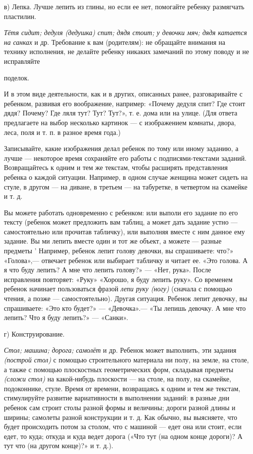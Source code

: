 \documentclass[a5paper]{book}
\renewcommand{\emph}[1]{\textit{#1}}
\begin{document}
в) Лепка. Лучше лепить из глины, но если ее нет, помогайте ребенку
размягчать пластилин.

\emph{Тётя сидит; дедуля (дедушка) спит; дядя стоит; у девочки мяч; дядя
катается на санках} и др. Требование к вам (родителям): не обращайте
внимания на технику исполнения, не делайте ребенку никаких замечаний по
этому поводу и не исправляйте

поделок.

И в этом виде деятельности, как и в других, описанных ранее,
разговаривайте с ребенком, развивая его воображение, например: «Почему
дедуля спит? Где стоит дядя? Почему? Где ляля тут? Тут? Тут?», т. е.
дома или на улице. (Для ответа предлагаете на выбор несколько картинок
--- с изображением комнаты, двора, леса, поля и т. п. в разное время
года.)

Записывайте, какие изображения делал ребенок по тому или иному заданию,
а лучше --- некоторое время сохраняйте его работы с подписями-текстами
заданий. Возвращайтесь к одним и тем же текстам, чтобы расширять
представления ребенка о каждой ситуации. Например, в одном случае
женщина может сидеть на стуле, в другом --- на диване, в третьем --- на
табуретке, в четвертом на скамейке и т. д.

Вы можете работать одновременно с ребенком: или выполи его задание по
его тексту (ребенок может предложить вам таблиц, а может дать задание
устно --- самостоятельно или прочитав табличку), или выполняя вместе с
ним данное ему задание. Вы ми лепить вместе один и тот же объект, а
можете --- разные предметы ' Например, ребенок лепит голову девочки, вы
спрашиваете: что?» «Голова»,--- отвечает ребенок или выбирает табличку и
читает ее. «Это голова. А я что буду лепить? А мне что лепить голову?»
--- «Нет, рука». После исправления повторяет: «Руку» «Хорошо, я буду
лепить руку». Со временем ребенок начинает пользоваться фразой
\emph{лепи руку (ногу)} (сначала с помощью чтения, а позже ---
самостоятельно). Другая ситуация. Ребенок лепит девочку, вы спрашиваете:
«Это кто будет?» --- «Девочка».--- «Ты лепишь девочку. А мне что лепить?
Что я буду лепить?» --- «Санки».

г) Конструирование.

\emph{Стол; машина; дорога; самолёт} и др. Ребенок может выполнить, эти
задания \emph{(построй стол)} с помощью строительного материала ни полу,
на земле, на столе, а также с помощью плоскостных геометрических форм,
складывая предметы \emph{(сложи стол)} на какой-нибудь плоскости --- на
столе, на полу, на скамейке, подоконнике, стуле. Время от времени,
возвращаясь к одним и тем же текстам, стимулируйте развитие
вариативности в выполнении заданий: в разные дни ребенок сам строит
столы разной формы и величины; дороги разной длины и ширины; самолеты
разной конструкции и т. д. Как обычно, вы выясняете, что будет
происходить потом за столом, что с машиной --- едет она или стоит, если
едет, то куда; откуда и куда ведет дорога («Что тут (на одном конце
дороги)? А тут что (на другом конце)?» и т. д.).
\end{document}

